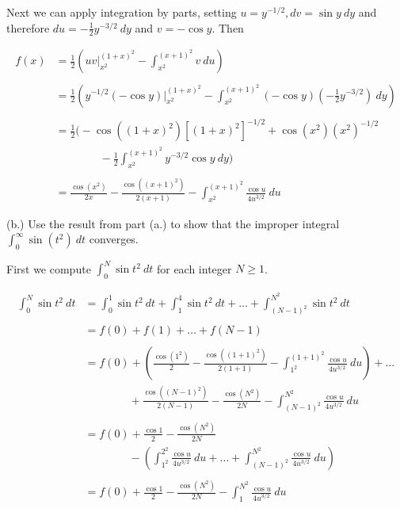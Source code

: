 \documentclass{article}
\begin{document}
  Next we can apply integration by parts, setting $u = y^{-1/2}, dv = \sin y \ dy$ and therefore $du=-\frac 1 2 y^{-3/2}\ dy$ and $v=-\cos y$.  Then 

  \begin{align*}
    f(x) &= \frac 1 2 \left( uv\bigg|_{x^2}^{(1+x)^2} - \int_{x^2}^{(x+1)^2} v\ du \right) \\\\
    &= \frac 1 2 \left( y^{-1/2}(-\cos y)\bigg|_{x^2}^{(1+x)^2} - \int_{x^2}^{(x+1)^2}(-\cos y)\left(-\frac 1 2 y ^{-3/2}\right)\ dy \right) \\\\
    &= \frac 1 2 \Bigg(-\cos((1+x)^2)[(1+x)^2]^{-1/2} + \cos(x^2)(x^2)^{-1/2} \\
    & \qquad \qquad - \frac 1 2 \int_{x^2}^{(x+1)^2} y ^{-3/2}\cos y\ dy \Bigg) \\\\
    &= \frac{\cos(x^2)}{2x}-\frac{\cos((x+1)^2)}{2(x+1)}-\int_{x^2}^{(x+1)^2}\frac{\cos u}{4u^{3/2}}\ du
  \end{align*}

  \vspace{1cm}

  {\Large \color{Sepia} (b.) Use the result from part (a.) to show that the improper integral $\int_0^\infty \sin(t^2)\ dt$ converges.}

  \vspace{1cm}

  First we compute $\int_0^N \sin t^2 \ dt$ for each integer $N\geq 1$.  

  \begin{align*}
    \int_0^N \sin t^2 \ dt &= \int_0^1 \sin t^2 \ dt + \int_1^4 \sin t^2 \ dt + \dots + \int_{(N-1)^2}^{N^2} \sin t^2 \ dt \\\\
    &= f(0)+f(1)+\dots + f(N-1) \\\\
    &= f(0) + \left(\frac{\cos(1^2)}{2}-\frac{\cos((1+1)^2)}{2(1+1)}-\int_{1^2}^{(1+1)^2}\frac{\cos u}{4u^{3/2}}\ du\right) + \dots  \\
     & \qquad \qquad + \frac{\cos((N-1)^2)}{2(N-1)}-\frac{\cos(N^2)}{2N}-\int_{(N-1)^2}^{N^2}\frac{\cos u}{4u^{3/2}}\ du \\\\
    &= f(0) + \frac{\cos 1}{2}-\frac{\cos (N^2)}{2N} \\
    & \qquad \qquad - \left(\int_{1^2}^{2^2}\frac{\cos u}{4u^{3/2}}\ du + \dots + \int_{(N-1)^2}^{N^2}\frac{\cos u}{4u^{3/2}}\ du\right) \\\\
    &= f(0) + \frac{\cos 1}{2}-\frac{\cos (N^2)}{2N} -\int_1^{N^2}\frac{\cos u}{4u^{3/2}} \ du
  \end{align*}
\end{document}
